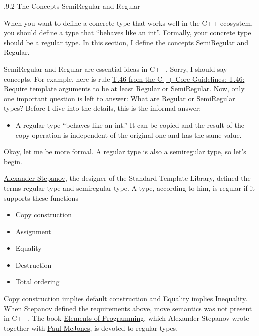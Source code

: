 .9.2\hspace{0.2cm} The Concepts SemiRegular and Regular

When you want to define a concrete type that works well in the C++ ecosystem, you should define a type that “behaves like an int”. Formally, your concrete type should be a regular type. In this section, I define the concepts SemiRegular and Regular.

SemiRegular and Regular are essential ideas in C++. Sorry, I should say concepts. For example, here is rule \href{http://isocpp.github.io/CppCoreGuidelines/CppCoreGuidelines#Rt-regular}{T.46 from the C++ Core Guidelines: T.46: Require template arguments to be at least Regular or SemiRegular}. Now, only one important question is left to answer: What are Regular or SemiRegular types? Before I dive into the details, this is the informal answer:

\begin{itemize}
\item 
A regular type “behaves like an int.” It can be copied and the result of the copy operation is independent of the original one and has the same value.
\end{itemize}

Okay, let me be more formal. A regular type is also a semiregular type, so let’s begin.


\begin{tcolorbox}[colback=blue!5!white,colframe=blue!75!black,title=Regular Types]

\href{https://en.wikipedia.org/wiki/Alexander_Stepanov}{Alexander Stepanov}, the designer of the Standard Template Library, defined the terms regular type and semiregular type. A type, according to him, is regular if it supports these functions

\begin{itemize}
\item 
Copy construction

\item 
Assignment

\item 
Equality

\item 
Destruction

\item 
Total ordering
\end{itemize}

Copy construction implies default construction and Equality implies Inequality. When Stepanov defined the requirements above, move semantics was not present in C++. The book \href{http://elementsofprogramming.com/}{Elements of Programming}, which Alexander Stepanov wrote together with \href{https://www.mcjones.org/paul/}{Paul McJones}, is devoted to regular types.

\end{tcolorbox}

